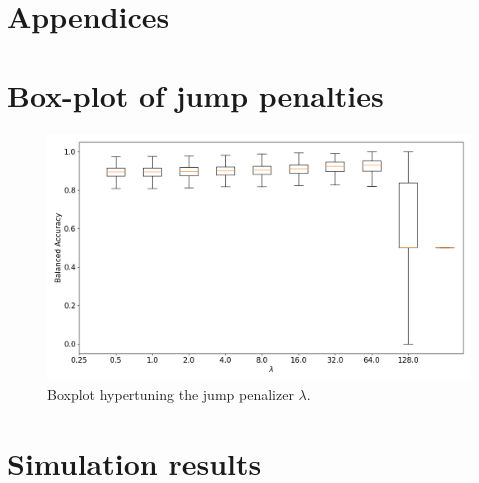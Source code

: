 \newpage

\appendix
\section{Appendices}



\section{Box-plot of jump penalties}
\label{appendix:box_plot}

\begin{figure}[H] 
    \centering
    \includegraphics[width=1\textwidth]{analysis/model_convergence/images/jump_penalties_box.png}
    \caption[Boxplot hypertuning the jump penalizer $\lambda$]{Boxplot hypertuning the jump penalizer $\lambda$.}
\end{figure}

\section{Simulation results}
\label{appendix:model_convergence}

